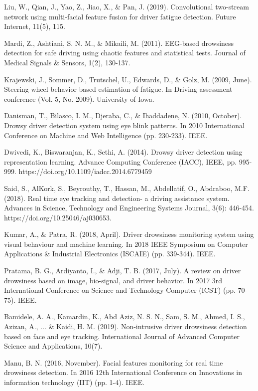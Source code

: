 \documentclass[conference]{IEEEtran}
\begin{document}
\begin{thebibliography}{00}
 Liu, W., Qian, J., Yao, Z., Jiao, X., \& Pan, J. (2019). Convolutional two-stream network using multi-facial feature fusion for driver fatigue detection. Future Internet, 11(5), 115.

 Mardi, Z., Ashtiani, S. N. M., \& Mikaili, M. (2011). EEG-based drowsiness detection for safe driving using chaotic features and statistical tests. Journal of Medical Signals \& Sensors, 1(2), 130-137.

 Krajewski, J., Sommer, D., Trutschel, U., Edwards, D., \& Golz, M. (2009, June). Steering wheel behavior based estimation of fatigue. In Driving assessment conference (Vol. 5, No. 2009). University of Iowa.

 Danisman, T., Bilasco, I. M., Djeraba, C., \& Ihaddadene, N. (2010, October). Drowsy driver detection system using eye blink patterns. In 2010 International Conference on Machine and Web Intelligence (pp. 230-233). IEEE.

 Dwivedi, K., Biswaranjan, K., Sethi, A. (2014). Drowsy driver detection using representation learning. Advance Computing Conference (IACC), IEEE, pp. 995-999. https://doi.org/10.1109/iadcc.2014.6779459

 Said, S., AlKork, S., Beyrouthy, T., Hassan, M., Abdellatif, O., Abdraboo, M.F. (2018). Real time eye tracking and detection- a driving assistance system. Advances in Science, Technology and Engineering Systems Journal, 3(6): 446-454. https://doi.org/10.25046/aj030653.

 Kumar, A., \& Patra, R. (2018, April). Driver drowsiness monitoring system using visual behaviour and machine learning. In 2018 IEEE Symposium on Computer Applications \& Industrial Electronics (ISCAIE) (pp. 339-344). IEEE.

 Pratama, B. G., Ardiyanto, I., \& Adji, T. B. (2017, July). A review on driver drowsiness based on image, bio-signal, and driver behavior. In 2017 3rd International Conference on Science and Technology-Computer (ICST) (pp. 70-75). IEEE.

 Bamidele, A. A., Kamardin, K., Abd Aziz, N. S. N., Sam, S. M., Ahmed, I. S., Azizan, A., ... \& Kaidi, H. M. (2019). Non-intrusive driver drowsiness detection based on face and eye tracking. International Journal of Advanced Computer Science and Applications, 10(7).

 Manu, B. N. (2016, November). Facial features monitoring for real time drowsiness detection. In 2016 12th International Conference on Innovations in information technology (IIT) (pp. 1-4). IEEE.

\end{thebibliography}
\end{document}
